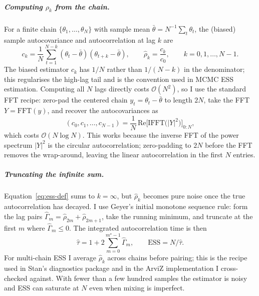 \documentclass{article}
\begin{document}
\subparagraph{Computing $\rho_k$ from the chain.}
For a finite chain $\{\theta_1, \ldots, \theta_N\}$ with sample mean $\bar\theta = N^{-1}\sum_t \theta_t$, the (biased) sample autocovariance and autocorrelation at lag $k$ are
\begin{equation}
c_k = \frac{1}{N}\sum_{t=1}^{N-k} (\theta_t - \bar\theta)(\theta_{t+k} - \bar\theta), \qquad
\hat\rho_k = \frac{c_k}{c_0}, \qquad k = 0, 1, \ldots, N-1.
\label{eq:autocorr-def}
\end{equation}
The biased estimator $c_k$ has $1/N$ rather than $1/(N-k)$ in the denominator; this regularises the high-lag tail and is the convention used in MCMC ESS estimation. Computing all $N$ lags directly costs $\mathcal{O}(N^2)$, so I use the standard FFT recipe: zero-pad the centered chain $y_t = \theta_t - \bar\theta$ to length $2N$, take the FFT $Y = \mathrm{FFT}(y)$, and recover the autocovariances as
\begin{equation}
(c_0, c_1, \ldots, c_{N-1}) = \frac{1}{N}\,\mathrm{Re}\bigl[\mathrm{IFFT}\bigl(|Y|^2\bigr)\bigr]_{0:N},
\label{eq:autocorr-fft}
\end{equation}
which costs $\mathcal{O}(N \log N)$. This works because the inverse FFT of the power spectrum $|Y|^2$ is the circular autocorrelation; zero-padding to $2N$ before the FFT removes the wrap-around, leaving the linear autocorrelation in the first $N$ entries.

\subparagraph{Truncating the infinite sum.}
Equation~\ref{eq:ess-def} sums to $k = \infty$, but $\hat\rho_k$ becomes pure noise once the true autocorrelation has decayed. I use Geyer's initial monotone sequence rule: form the lag pairs $\hat\Gamma_m = \hat\rho_{2m} + \hat\rho_{2m+1}$, take the running minimum, and truncate at the first $m$ where $\hat\Gamma_m \le 0$. The integrated autocorrelation time is then
\[
\hat\tau = 1 + 2\sum_{m=0}^{m^\star-1} \hat\Gamma_m, \qquad \mathrm{ESS} = N / \hat\tau.
\]
For multi-chain ESS I average $\hat\rho_k$ across chains before pairing; this is the recipe used in Stan's diagnostics package and in the ArviZ implementation I cross-checked against. With fewer than a few hundred samples the estimator is noisy and ESS can saturate at $N$ even when mixing is imperfect.
\end{document}
